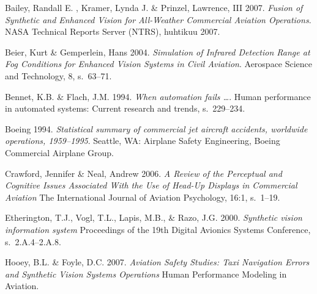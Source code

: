 \documentclass[utf8,bachelor,manualbib]{gradu3}
\begin{document}
\begin{thebibliography}{}



Bailey, Randall E. , Kramer, Lynda J. \& Prinzel, Lawrence, III 2007.
\textit{Fusion of Synthetic and Enhanced Vision for All-Weather Commercial Aviation Operations}.
NASA Technical Reports Server (NTRS), huhtikuu 2007.

Beier, Kurt \& Gemperlein, Hans 2004.
\textit{Simulation of Infrared Detection Range at Fog Conditions for Enhanced Vision Systems in Civil Aviation}.
Aerospace Science and Technology, 8, s.~63--71.

Bennet, K.B. \& Flach, J.M. 1994.
\textit{When automation fails …}.
Human performance in automated systems: Current research and trends, s.~229--234.

Boeing 1994.
\textit{Statistical summary of commercial jet aircraft accidents, worldwide operations,
1959–1995}.
Seattle, WA: Airplane Safety Engineering, Boeing Commercial Airplane Group.

Crawford, Jennifer \& Neal, Andrew 2006.
\textit{A Review of the Perceptual and Cognitive Issues Associated With the Use of Head-Up Displays in Commercial Aviation}
The International Journal of Aviation Psychology, 16:1, s.~1--19.

Etherington, T.J., Vogl, T.L., Lapis, M.B., \& Razo, J.G. 2000.
\textit{Synthetic vision information system}
Proceedings of the 19th Digital Avionics Systems Conference, s.~2.A.4--2.A.8.

Hooey, B.L. \& Foyle, D.C. 2007.
\textit{Aviation Safety Studies: Taxi Navigation Errors and Synthetic Vision Systems Operations}
Human Performance Modeling in Aviation.


\end{thebibliography}
\end{document}
